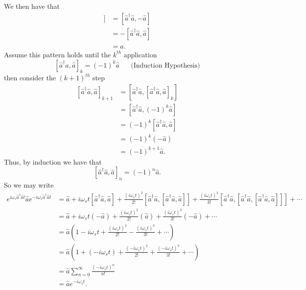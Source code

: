 \documentclass[aps,pra,showpacs,amsmath,amssymb,nofootinbib,longbibliography,superscriptaddress
]{revtex4-1}
\theoremstyle{definition}
\theoremstyle{remark}
\newcommand{\0}{\hat{0}}
\begin{document}
We then have that
\begin{align}
    [\hat{a}^{\dagger} \hat{a}, [\hat{a}^{\dagger} \hat{a}, \hat{a}]] &= [\hat{a}^{\dagger} \hat{a}, -\hat{a}] \nonumber \\
    &= -[\hat{a}^{\dagger} \hat{a}, \hat{a}] \nonumber \\
    &= \hat{a}.
\end{align}
Assume this pattern holds until the $k^{th}$ application
\begin{equation}
    {[\hat{a}^{\dagger} \hat{a}, \hat{a}]}_{k} = {(-1)}^k \hat{a}\;\;\;\;\;\;\text{(Induction Hypothesis)}
\end{equation}
then consider the ${(k+1)}^{th}$ step
\begin{align}
    {[\hat{a}^{\dagger} \hat{a}, \hat{a}]}_{k+1} &= [\hat{a}^{\dagger} \hat{a}, {[\hat{a}^{\dagger} \hat{a}, \hat{a}]}_{k}] \nonumber \\
    &= [\hat{a}^{\dagger} \hat{a}, {(-1)}^k \hat{a}] \nonumber \\
    &= {(-1)}^k [\hat{a}^{\dagger} \hat{a}, \hat{a}] \nonumber \\
    &= {(-1)}^k (-\hat{a}) \nonumber \\
    &= {(-1)}^{k+1} \hat{a}.
\end{align}
Thus, by induction we have that
\begin{equation}
    {[\hat{a}^{\dagger} \hat{a}, \hat{a}]}_{n} = {(-1)}^{n} \hat{a}.
\end{equation}
So we may write
\begin{align}
    e^{i\omega_s \hat{a}^{\dagger} \hat{a}t} \hat{a} e^{-i\omega_s \hat{a}^{\dagger} \hat{a}t}
    &= \hat{a} + i \omega_s t [\hat{a}^{\dagger} \hat{a}, \hat{a}] + \frac{(i \omega_s t)^2}{2!} [\hat{a}^{\dagger} \hat{a}, [\hat{a}^{\dagger} \hat{a}, \hat{a}]] + \frac{(i \omega_s t)^3}{3!}[\hat{a}^{\dagger} \hat{a}, [\hat{a}^{\dagger} \hat{a}, [\hat{a}^{\dagger} \hat{a}, \hat{a}]]] + \cdots \nonumber \\
    &= \hat{a} + i \omega_s t (-\hat{a}) + \frac{(i \omega_s t)^2}{2!} (\hat{a}) + \frac{(i \omega_s t)^3}{3!}(-\hat{a}) + \cdots \nonumber \\
    &= \hat{a}\left(1 - i \omega_s t + \frac{(i \omega_s t)^2}{2!} - \frac{(i \omega_s t)^3}{3!} + \cdots \right)\nonumber \\
    &= \hat{a}\left(1 + (-i \omega_s t) + \frac{(-i \omega_s t)^2}{2!} + \frac{(-i \omega_s t)^3}{3!} + \cdots \right)\nonumber \\
    &= \hat{a} \sum_{n=0}^{\infty} \frac{(-i \omega_s t)^n}{n!}\nonumber \\
    &= \hat{a} e^{-i \omega_s t}.
\end{align}
\end{document}
